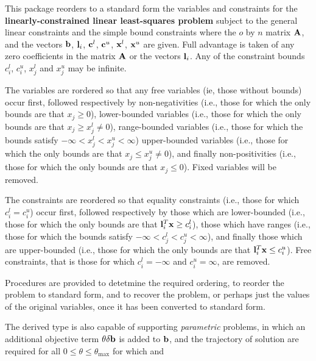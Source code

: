 \documentclass{galahad}
\begin{document}
\galheader


\galsummary
This package reorders to a standard form the variables and constraints
for the {\bf linearly-constrained linear least-squares problem}
subject to the general linear constraints
and the simple bound constraints
where the $o$ by $n$ matrix ${\mathbf{A}}$, and the 
vectors ${\mathbf{b}}$, ${\mathbf{l}}_{i}$, ${\mathbf{c}}^{l}$, ${\mathbf{c}}^{u}$, ${\mathbf{x}}^{l}$, 
${\mathbf{x}}^{u}$ are given.
Full advantage is taken of any zero coefficients in the matrix ${\mathbf{A}}$ or the
vectors ${\mathbf{l}}_{i}$. 
Any of the constraint bounds $c_{i}^{l}$, $c_{i}^{u}$, 
$x_{j}^{l}$ and $x_{j}^{u}$ may be infinite.

The variables are rordered so that any
free variables (ie, those without bounds) occur first, followed
respectively by 
non-negativities (i.e., those for which the only
bounds are that $x_j \geq 0$),
lower-bounded variables (i.e., those for which the only
bounds are that $x_j \geq x_j^l \neq 0$),
range-bounded variables (i.e., those for which the 
bounds satisfy $- \infty < x_j^l < x_j^u < \infty$)
upper-bounded variables (i.e., those for which the only
bounds are that $x_j \leq x_j^u \neq 0$), and finally
non-positivities (i.e., those for which the only
bounds are that $x_j \leq 0$).
Fixed variables will be removed. 

The constraints are reordered so that equality constraints (i.e., those
for which $c_i^l = c_i^u$) occur first, followed 
respectively by those 
which are lower-bounded (i.e., those for which the only
bounds are that ${\mathbf{l}}_i^T {\mathbf{x}} \geq c_i^l$),
those which have ranges (i.e., those for which the 
bounds satisfy 
$- \infty < c_j^l < c_j^u < \infty$), 
and finally those which are upper-bounded (i.e., those for which the only
bounds are that ${\mathbf{l}}_i^T {\mathbf{x}} \leq c_i^u$).
Free constraints, that is those for which 
$c_i^l = - \infty$ and $c_i^u = \infty$, are removed.

Procedures are provided to detetmine the required ordering, to
reorder the problem to standard form, and
to recover the problem, or perhaps just the values of
the original variables, once it has been converted to standard form.

The derived type is also capable of supporting {\em parametric}
problems, in which an additional objective
term $\theta \delta {\mathbf{b}}$ is added to ${\mathbf{b}}$, and the trajectory of 
solution are required for all $0 \leq \theta \leq \theta_{\max}$ 
for which
and 
\end{document}
